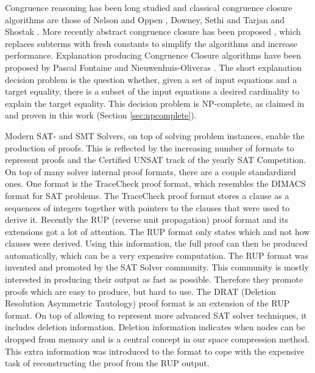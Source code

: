 Congruence reasoning has been long studied and classical congruence closure algorithms are those of Nelson and Oppen \cite{Nelson1980}, Downey, Sethi and Tarjan \cite{Downey1980} and Shostak \cite{Shostak1978}.
More recently abstract congruence closure has been proposed \cite{Bachmair2000}, which replaces subterms with fresh constants to simplify the algorithms and increase performance.
Explanation producing Congruence Closure algorithms have been proposed by Pascal Fontaine \cite{Fontaine2004} and Nieuwenhuis-Oliveras \cite{Nieuwenhuis2007,Nieuwenhuis2005}.
The short explanation decision problem is the question whether, given a set of input equations and a target equality, there is a subset of the input equations a desired cardinality to explain the target equality.
This decision problem is NP-complete, as claimed in \cite{Nieuwenhuis2005,Nieuwenhuis2007} and proven in this work (Section \ref{sec:npcomplete}).

Modern SAT- and SMT Solvers, on top of solving problem instances, enable the production of proofs.
This is reflected by the increasing number of formats to represent proofs and the Certified UNSAT track of the yearly SAT Competition.
On top of many solver internal proof formats, there are a couple standardized ones.
One format is the TraceCheck proof format, which resembles the DIMACS format for SAT problems.
The TraceCheck proof format stores a clause as a sequences of integers together with pointers to the clauses that were used to derive it.
Recently the RUP (reverse unit propagation) proof format and its extensions got a lot of attention.
The RUP format only states which and not how clauses were derived.
Using this information, the full proof can then be produced automatically, which can be a very expensive computation.
The RUP format was invented and promoted by the SAT Solver community.
This community is mostly interested in producing their output as fast as possible.
Therefore they promote proofs which are easy to produce, but hard to use.
The DRAT (Deletion Resolution Asymmetric Tautology) proof format \cite{Wetzler2014} is an extension of the RUP format.
On top of allowing to represent more advanced SAT solver techniques, it includes deletion information.
Deletion information indicates when nodes can be dropped from memory and is a central concept in our space compression method.
This extra information was introduced to the format to cope with the expensive task of reconstructing the proof from the RUP output.


